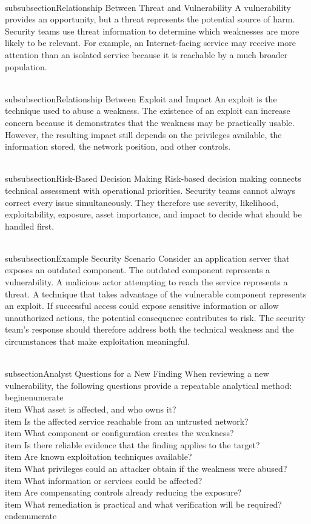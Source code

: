 \documentclass[11pt,a4paper]{article}
\begin{document}
\\subsubsection{Relationship Between Threat and Vulnerability}
A vulnerability provides an opportunity, but a threat represents the potential source of harm. Security teams use threat information to determine which weaknesses are more likely to be relevant. For example, an Internet-facing service may receive more attention than an isolated service because it is reachable by a much broader population.

\\subsubsection{Relationship Between Exploit and Impact}
An exploit is the technique used to abuse a weakness. The existence of an exploit can increase concern because it demonstrates that the weakness may be practically usable. However, the resulting impact still depends on the privileges available, the information stored, the network position, and other controls.

\\subsubsection{Risk-Based Decision Making}
Risk-based decision making connects technical assessment with operational priorities. Security teams cannot always correct every issue simultaneously. They therefore use severity, likelihood, exploitability, exposure, asset importance, and impact to decide what should be handled first.

\\subsubsection{Example Security Scenario}
Consider an application server that exposes an outdated component. The outdated component represents a vulnerability. A malicious actor attempting to reach the service represents a threat. A technique that takes advantage of the vulnerable component represents an exploit. If successful access could expose sensitive information or allow unauthorized actions, the potential consequence contributes to risk. The security team's response should therefore address both the technical weakness and the circumstances that make exploitation meaningful.

\\subsection{Analyst Questions for a New Finding}
When reviewing a new vulnerability, the following questions provide a repeatable analytical method:
\\begin{enumerate}
\\item What asset is affected, and who owns it?
\\item Is the affected service reachable from an untrusted network?
\\item What component or configuration creates the weakness?
\\item Is there reliable evidence that the finding applies to the target?
\\item Are known exploitation techniques available?
\\item What privileges could an attacker obtain if the weakness were abused?
\\item What information or services could be affected?
\\item Are compensating controls already reducing the exposure?
\\item What remediation is practical and what verification will be required?
\\end{enumerate}
\end{document}
